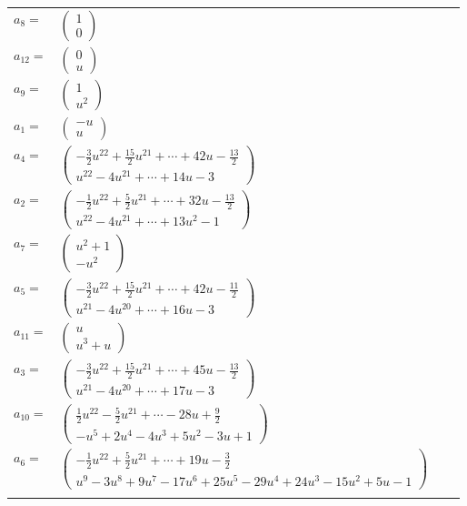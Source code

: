\documentclass[1p]{elsarticle_modified}
\theoremstyle{definition}
\begin{document}
\begin{tabular}{m{7pt} m{180pt} m{7pt} m{180pt} }
\flushright $a_{8}=$&$\begin{pmatrix}1\\0\end{pmatrix}$ \\
\flushright $a_{12}=$&$\begin{pmatrix}0\\u\end{pmatrix}$ \\
\flushright $a_{9}=$&$\begin{pmatrix}1\\u^2\end{pmatrix}$ \\
\flushright $a_{1}=$&$\begin{pmatrix}- u\\u\end{pmatrix}$ \\
\flushright $a_{4}=$&$\begin{pmatrix}-\frac{3}{2} u^{22}+\frac{15}{2} u^{21}+\cdots+42 u-\frac{13}{2}\\u^{22}-4 u^{21}+\cdots+14 u-3\end{pmatrix}$ \\
\flushright $a_{2}=$&$\begin{pmatrix}-\frac{1}{2} u^{22}+\frac{5}{2} u^{21}+\cdots+32 u-\frac{13}{2}\\u^{22}-4 u^{21}+\cdots+13 u^2-1\end{pmatrix}$ \\
\flushright $a_{7}=$&$\begin{pmatrix}u^2+1\\- u^2\end{pmatrix}$ \\
\flushright $a_{5}=$&$\begin{pmatrix}-\frac{3}{2} u^{22}+\frac{15}{2} u^{21}+\cdots+42 u-\frac{11}{2}\\u^{21}-4 u^{20}+\cdots+16 u-3\end{pmatrix}$ \\
\flushright $a_{11}=$&$\begin{pmatrix}u\\u^3+u\end{pmatrix}$ \\
\flushright $a_{3}=$&$\begin{pmatrix}-\frac{3}{2} u^{22}+\frac{15}{2} u^{21}+\cdots+45 u-\frac{13}{2}\\u^{21}-4 u^{20}+\cdots+17 u-3\end{pmatrix}$ \\
\flushright $a_{10}=$&$\begin{pmatrix}\frac{1}{2} u^{22}-\frac{5}{2} u^{21}+\cdots-28 u+\frac{9}{2}\\- u^5+2 u^4-4 u^3+5 u^2-3 u+1\end{pmatrix}$ \\
\flushright $a_{6}=$&$\begin{pmatrix}-\frac{1}{2} u^{22}+\frac{5}{2} u^{21}+\cdots+19 u-\frac{3}{2}\\u^9-3 u^8+9 u^7-17 u^6+25 u^5-29 u^4+24 u^3-15 u^2+5 u-1\end{pmatrix}$\\&\end{tabular}
\end{document}

